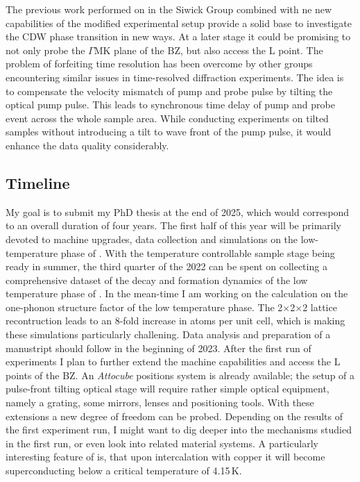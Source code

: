 The previous work performed on \ts\space in the Siwick Group combined with ne new capabilities of the modified experimental setup provide a solid base to investigate the \ac{CDW} phase transition in new ways.
At a later stage it could be promising to not only probe the $\Gamma\mathrm{MK}$ plane of the \ac{BZ}, but also access the L point.
The problem of forfeiting time resolution has been overcome by other groups encountering similar issues in time-resolved diffraction experiments.
The idea is to compensate the velocity mismatch of pump and probe pulse by tilting the optical pump pulse.
This leads to synchronous time delay of pump and probe event across the whole sample area\cite{baum2006,zhou2013}.
While conducting experiments on tilted samples without introducing a tilt to wave front of the pump pulse, it would enhance the data quality considerably.

\subsection*{Timeline}
My goal is to submit my PhD thesis at the end of 2025, which would correspond to an overall duration of four years.
The first half of this year will be primarily devoted to machine upgrades, data collection and simulations on the low-temperature phase of \ts.
With the temperature controllable sample stage being ready in summer, the third quarter of the 2022 can be spent on collecting a comprehensive dataset of the decay and formation dynamics of the low temperature phase of \ts.
In the mean-time I am working on the calculation on the one-phonon structure factor of the low temperature phase.
The 2$\times$2$\times$2 lattice recontruction leads to an 8-fold increase in atoms per unit cell, which is making these simulations particularly challening.
Data analysis and preparation of a manustript should follow in the beginning of 2023.
After the first run of experiments I plan to further extend the machine capabilities and access the L points of the \ac{BZ}.
An \emph{Attocube} positions system is already available; the setup of a pulse-front tilting optical stage will require rather simple optical equipment, namely a grating, some mirrors, lenses and positioning tools.
With these extensions a new degree of freedom can be probed.
Depending on the results of the first experiment run, I might want to dig deeper into the mechanisms studied in the first run, or even look into related material systems.
A particularly interesting feature of \ts\space is, that upon intercalation with copper it will become superconducting below a critical temperature of 4.15\,K\cite{morosan2006}.

